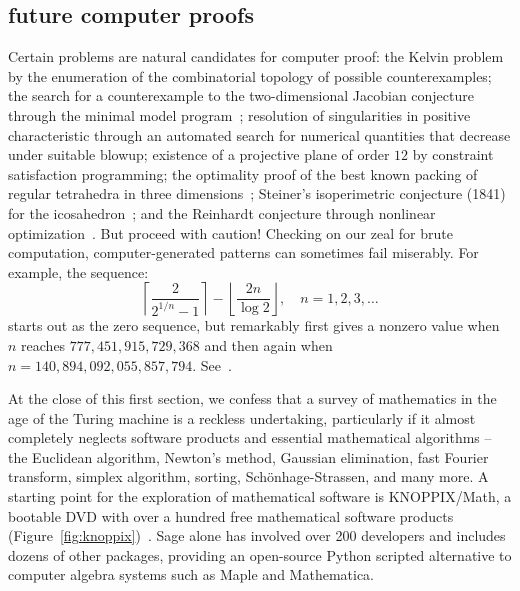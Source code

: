 \documentclass{llncs}
\begin{document}
\subsection{future computer proofs}

Certain problems are natural candidates for computer proof: the Kelvin
problem by the enumeration of the combinatorial topology of possible
counterexamples; the search for a counterexample to the
two-dimensional Jacobian conjecture through the minimal model
program~\cite{Borisov}; resolution of singularities in positive
characteristic through an automated search for numerical quantities
that decrease under suitable blowup; existence of a projective plane
of order $12$ by constraint satisfaction programming; the optimality
proof of the best known packing of regular tetrahedra in three
dimensions~\cite{Chen-2010}; Steiner's isoperimetric conjecture (1841) for the
icosahedron~\cite{Steiner41}; and the Reinhardt conjecture through
nonlinear optimization~\cite{HR11}.  But proceed with caution!
Checking on our zeal for brute computation, computer-generated
patterns can sometimes fail miserably.  For example, the 
sequence:
\[
\left\lceil{\frac{2}{2^{1/n} - 1}}\right\rceil- 
\left\lfloor{\frac{2 n}{\log 2}}\right\rfloor,\quad n=1,2,3,\ldots
\]
starts out as the zero sequence, but remarkably first gives a nonzero
value when $n$ reaches $777,451,915,729,368$ and then again when
$n=140,894,092,055,857,794$.  See~\cite{Stanley}.

\smallskip At the close of this first section, we confess that a
survey of mathematics in the age of the Turing machine is a reckless
undertaking, particularly if it almost completely neglects software
products and essential mathematical algorithms -- the Euclidean
algorithm, Newton's method, Gaussian elimination, fast Fourier
transform, simplex algorithm, sorting, Sch\"onhage-Strassen, and many
more.  A starting point for the exploration of mathematical software
is KNOPPIX/Math, a bootable DVD with over a hundred free mathematical
software products (Figure~\ref{fig:knoppix})~\cite{HK08}.  Sage alone
has involved over 200 developers and includes dozens of other
packages, providing an open-source Python scripted alternative to
computer algebra systems such as Maple and Mathematica.
\end{document}
